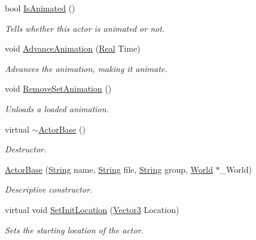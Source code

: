 \begin{DoxyCompactItemize}
bool \hyperlink{classphys_1_1ActorBase_ac98f9fdae0da939e352f8fcff217457c}{IsAnimated} ()
\begin{DoxyCompactList}\small\item\em Tells whether this actor is animated or not. \item\end{DoxyCompactList}\item 
void \hyperlink{classphys_1_1ActorBase_a37d5a8a3ae4ca3c6e7d14706096faa85}{AdvanceAnimation} (\hyperlink{namespacephys_af7eb897198d265b8e868f45240230d5f}{Real} Time)
\begin{DoxyCompactList}\small\item\em Advances the animation, making it animate. \item\end{DoxyCompactList}\item 
void \hyperlink{classphys_1_1ActorBase_ac42e5e47504d7f296bb0a2bedc2ded07}{RemoveSetAnimation} ()
\begin{DoxyCompactList}\small\item\em Unloads a loaded animation. \item\end{DoxyCompactList}\item 
virtual \hyperlink{classphys_1_1ActorBase_a5e5d4b50c83c6851e554b5e7ad65403f}{$\sim$ActorBase} ()
\begin{DoxyCompactList}\small\item\em Destructor. \item\end{DoxyCompactList}\item 
\hyperlink{classphys_1_1ActorBase_ad9d90a68921ce81653e9950c1330809d}{ActorBase} (\hyperlink{namespacephys_aa03900411993de7fbfec4789bc1d392e}{String} name, \hyperlink{namespacephys_aa03900411993de7fbfec4789bc1d392e}{String} file, \hyperlink{namespacephys_aa03900411993de7fbfec4789bc1d392e}{String} group, \hyperlink{classphys_1_1World}{World} $\ast$\_\-World)
\begin{DoxyCompactList}\small\item\em Descriptive constructor. \item\end{DoxyCompactList}\item 
virtual void \hyperlink{classphys_1_1ActorBase_a0ff0980bcf33a8205eb058b8caa1f36b}{SetInitLocation} (\hyperlink{classphys_1_1Vector3}{Vector3} Location)
\begin{DoxyCompactList}\small\item\em Sets the starting location of the actor. \item\end{DoxyCompactList}\item 

\end{DoxyCompactItemize}
